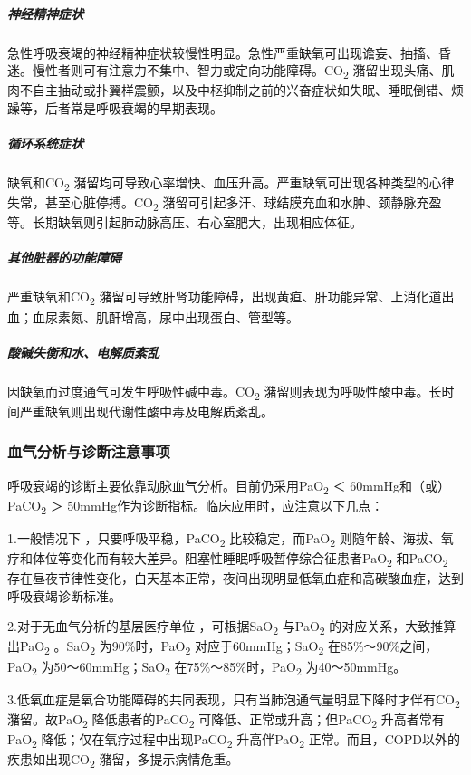 \subparagraph{神经精神症状}

急性呼吸衰竭的神经精神症状较慢性明显。急性严重缺氧可出现谵妄、抽搐、昏迷。慢性者则可有注意力不集中、智力或定向功能障碍。CO\textsubscript{2}
潴留出现头痛、肌肉不自主抽动或扑翼样震颤，以及中枢抑制之前的兴奋症状如失眠、睡眠倒错、烦躁等，后者常是呼吸衰竭的早期表现。

\subparagraph{循环系统症状}

缺氧和CO\textsubscript{2}
潴留均可导致心率增快、血压升高。严重缺氧可出现各种类型的心律失常，甚至心脏停搏。CO\textsubscript{2}
潴留可引起多汗、球结膜充血和水肿、颈静脉充盈等。长期缺氧则引起肺动脉高压、右心室肥大，出现相应体征。

\subparagraph{其他脏器的功能障碍}

严重缺氧和CO\textsubscript{2}
潴留可导致肝肾功能障碍，出现黄疸、肝功能异常、上消化道出血；血尿素氮、肌酐增高，尿中出现蛋白、管型等。

\subparagraph{酸碱失衡和水、电解质紊乱}

因缺氧而过度通气可发生呼吸性碱中毒。CO\textsubscript{2}
潴留则表现为呼吸性酸中毒。长时间严重缺氧则出现代谢性酸中毒及电解质紊乱。

\subsubsection{血气分析与诊断注意事项}

呼吸衰竭的诊断主要依靠动脉血气分析。目前仍采用PaO\textsubscript{2} ＜
60mmHg和（或）PaCO\textsubscript{2} ＞
50mmHg作为诊断指标。临床应用时，应注意以下几点：

1.一般情况下 ，只要呼吸平稳，PaCO\textsubscript{2}
比较稳定，而PaO\textsubscript{2}
则随年龄、海拔、氧疗和体位等变化而有较大差异。阻塞性睡眠呼吸暂停综合征患者PaO\textsubscript{2}
和PaCO\textsubscript{2}
存在昼夜节律性变化，白天基本正常，夜间出现明显低氧血症和高碳酸血症，达到呼吸衰竭诊断标准。

2.对于无血气分析的基层医疗单位 ，可根据SaO\textsubscript{2}
与PaO\textsubscript{2} 的对应关系，大致推算出PaO\textsubscript{2}
。SaO\textsubscript{2} 为90\%时，PaO\textsubscript{2}
对应于60mmHg；SaO\textsubscript{2}
在85\%～90\%之间，PaO\textsubscript{2}
为50～60mmHg；SaO\textsubscript{2} 在75\%～85\%时，PaO\textsubscript{2}
为40～50mmHg。

3.低氧血症是氧合功能障碍的共同表现，只有当肺泡通气量明显下降时才伴有CO\textsubscript{2}
潴留。故PaO\textsubscript{2} 降低患者的PaCO\textsubscript{2}
可降低、正常或升高；但PaCO\textsubscript{2}
升高者常有PaO\textsubscript{2}
降低；仅在氧疗过程中出现PaCO\textsubscript{2} 升高伴PaO\textsubscript{2}
正常。而且，COPD以外的疾患如出现CO\textsubscript{2}
潴留，多提示病情危重。

